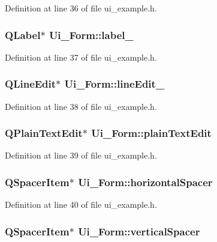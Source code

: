 Definition at line 36 of file ui\_\-example.h.\hypertarget{classUi__Form_c36d14f305d7e061dddbefb10f1cc07f}{
\subsubsection{\setlength{\rightskip}{0pt plus 5cm}QLabel$\ast$ {\bf Ui\_\-Form::label\_}}}
\label{classUi__Form_c36d14f305d7e061dddbefb10f1cc07f}




Definition at line 37 of file ui\_\-example.h.\hypertarget{classUi__Form_88fc296e3e271e922aa5d1d1927db978}{
\subsubsection{\setlength{\rightskip}{0pt plus 5cm}QLineEdit$\ast$ {\bf Ui\_\-Form::lineEdit\_}}}
\label{classUi__Form_88fc296e3e271e922aa5d1d1927db978}




Definition at line 38 of file ui\_\-example.h.\hypertarget{classUi__Form_719e0bdfecd5696d222b2ebe93cf0902}{
\subsubsection{\setlength{\rightskip}{0pt plus 5cm}QPlainTextEdit$\ast$ {\bf Ui\_\-Form::plainTextEdit}}}
\label{classUi__Form_719e0bdfecd5696d222b2ebe93cf0902}




Definition at line 39 of file ui\_\-example.h.\hypertarget{classUi__Form_a083de4d8d3e7bd048bee20ef99f2ea9}{
\subsubsection{\setlength{\rightskip}{0pt plus 5cm}QSpacerItem$\ast$ {\bf Ui\_\-Form::horizontalSpacer}}}
\label{classUi__Form_a083de4d8d3e7bd048bee20ef99f2ea9}




Definition at line 40 of file ui\_\-example.h.\hypertarget{classUi__Form_bfba4e1529538a2b814117392cbd4e01}{
\subsubsection{\setlength{\rightskip}{0pt plus 5cm}QSpacerItem$\ast$ {\bf Ui\_\-Form::verticalSpacer}}}
\label{classUi__Form_bfba4e1529538a2b814117392cbd4e01}




